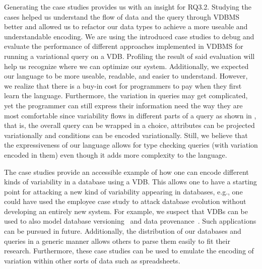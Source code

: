 Generating the case studies provides us with an insight for RQ3.2.
%
Studying the cases helped us understand the flow of
data and the query through VDBMS better and allowed us to refactor
our data types to achieve a more useable and understandable encoding. 
%
We are using the introduced case studies to debug and evaluate the
performance of different approaches implemented in VDBMS 
for running a variational query on a VDB. Profiling the result
of said evaluation will help us recognize where we can optimize
our system. 
%
Additionally, we expected our language to be more useable, readable, and
easier to understand. However, we realize that there is a buy-in cost
for programmers to pay when they first learn the language. Furthermore,
the variation in queries may get complicated, yet the programmer can 
still express their information need the way they are most comfortable
since variability flows in different parts of a query as shown in , 
that is, the overall query
can be wrapped in a choice, attributes can be projected variationally and
conditions can be encoded variationally. 
Still, we believe that the expressiveness of our
language allows for type checking queries (with variation encoded in them)
even though it adds more complexity 
to the language.

%
%
The case studies provide an accessible example of how one can encode different 
kinds of variability in a database using a VDB. This allows one to have a 
starting point for attacking a new kind of variability appearing in databases,
e.g., one could have used the employee case study to attack database 
evolution without developing an entirely new system. For example, 
we suspect that VDBs can be used to also model database 
versioning~\cite{datasetVersioning,dbVersioning} and
data provenance~\cite{bt07sigmod}. Such applications can be pursued in future.
%
Additionally, the distribution of our databases and queries in a generic
manner allows others to parse them easily to fit their research.
Furthermore, these case studies can be used to emulate the encoding of 
 variation within other sorts of data such as spreadsheets.
 
